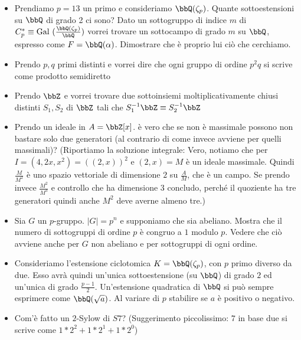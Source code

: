 \documentclass[a4paper,11pt,NoNotes,GeneralMath]{stdmdoc}
\newcommand{\Gal}{\text{Gal }}
\begin{document}
\begin{itemize}
        \item Prendiamo $p=13$ un primo e consideriamo $\bbQ(\zeta_p)$. Quante sottoestensioni su $\bbQ$ di grado 2 ci sono? Dato un sottogruppo di indice $m$ di $C_p^{*} \equiv \Gal(\frac{\bbQ(\zeta_p)}{\bbQ})$ vorrei trovare un sottocampo di grado $m$ su $\bbQ$, espresso come $F = \bbQ(\alpha)$. Dimostrare che è proprio lui ciò che cerchiamo.
        \item Prendo $p, q$ primi distinti e vorrei dire che ogni gruppo di ordine $p^2 q$ si scrive come prodotto semidiretto
        \item Prendo $\bbZ$ e vorrei trovare due sottoinsiemi moltiplicativamente chiusi distinti $S_1, S_2$ di $\bbZ$ tali che $S_1^{-1} \bbZ \equiv S_2^{-1} \bbZ$
        \item Prendo un ideale in $A = \bbZ [x]$. è vero che se non è massimale possono non bastare solo due generatori (al contrario di come invece avviene per quelli massimali)? (Riportiamo la soluzione integrale: Vero, notiamo che per $I = (4, 2x, x^2) = ((2, x))^2 $ e $(2, x) = M$ è un ideale massimale. Quindi $\frac{M}{M^2}$ è uno spazio vettoriale di dimensione $2$ su $\frac{A}{M}$, che è un campo. Se prendo invece $\frac{M^2}{M^3}$ e controllo che ha dimensione 3 concludo, perché il quoziente ha tre generatori quindi anche $M^2$ deve averne almeno tre.)
		\item Sia $G$ un $p$-gruppo. $\mid G \mid = p^n$ e supponiamo che sia abeliano. Mostra che il numero di sottogruppi di ordine $p$ è congruo a $1$ modulo $p$. Vedere che ciò avviene anche per $G$ non abeliano e per sottogruppi di ogni ordine.
		\item Consideriamo l'estensione ciclotomica $K = \bbQ (\zeta_p)$, con $p$ primo diverso da due. Esso avrà quindi un'unica sottoestensione (su $\bbQ$) di grado $2$ ed un'unica di grado $\frac{p-1}{2}$. Un'estensione quadratica di $\bbQ$ si può sempre esprimere come $\bbQ(\sqrt{a})$. Al variare di $p$ stabilire se $a$ è positivo o negativo.
		\item Com'è fatto un $2$-Sylow di $S7$? (Suggerimento piccolissimo: $7$ in base due si scrive come $1*2^2 + 1 *2^1 + 1*2^0$)
	\end{itemize}
	
\end{document}

